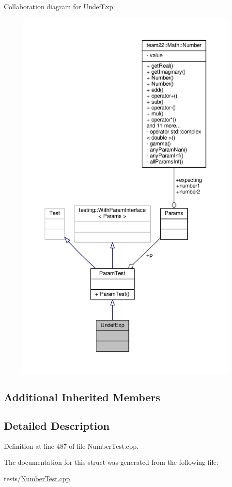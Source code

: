 Collaboration diagram for Undef\+Exp\+:
\nopagebreak
\begin{figure}[H]
\begin{center}
\leavevmode
\includegraphics[height=550pt]{struct_undef_exp__coll__graph}
\end{center}
\end{figure}
\subsection*{Additional Inherited Members}


\subsection{Detailed Description}


Definition at line 487 of file Number\+Test.\+cpp.



The documentation for this struct was generated from the following file\+:\begin{DoxyCompactItemize}
\item 
tests/\hyperlink{_number_test_8cpp}{Number\+Test.\+cpp}\end{DoxyCompactItemize}
